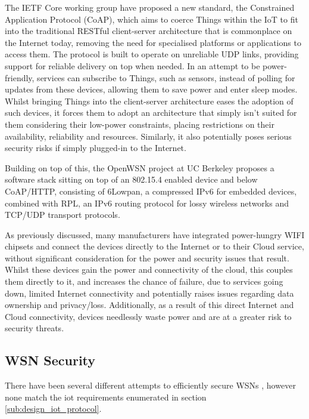 \documentclass{mpaper}
\begin{document}
The IETF Core working group have proposed a new standard, the Constrained Application Protocol (CoAP)\cite{IETF_COAP_HTTP}, which aims to coerce Things within the IoT to fit into the traditional RESTful client-server architecture that is commonplace on the Internet today, removing the need for specialised platforms or applications to access them. The protocol is built to operate on unreliable UDP links, providing support for reliable delivery on top when needed. In an attempt to be power-friendly, services can subscribe to Things, such as sensors, instead of polling for updates from these devices, allowing them to save power and enter sleep modes. Whilst bringing Things into the client-server architecture eases the adoption of such devices, it forces them to adopt an architecture that simply isn't suited for them considering their low-power constraints, placing restrictions on their availability, reliability and resources. Similarly, it also potentially poses serious security risks if simply plugged-in to the Internet\cite{BelkinWemo}.

Building on top of this, the OpenWSN project at UC Berkeley proposes a software stack sitting on top of an 802.15.4 enabled device and below CoAP/HTTP, consisting of 6Lowpan, a compressed IPv6 for embedded devices, combined with RPL, an IPv6 routing protocol for lossy wireless networks and TCP/UDP transport protocols.

As previously discussed, many manufacturers have integrated power-hungry WIFI chipsets and connect the devices directly to the Internet or to their Cloud service\cite{SmartThings,Belkin,Twine}, without significant consideration for the power and security issues that result. Whilst these devices gain the power and connectivity of the cloud, this couples them directly to it, and increases the chance of failure, due to services going down, limited Internet connectivity and potentially raises issues regarding data ownership and privacy/loss\cite{Playstation}. Additionally, as a result of this direct Internet and Cloud connectivity, devices needlessly waste power and are at a greater risk to security threats\cite{BelkinWemo,IoTWorm}. 
\subsection{WSN Security} %
\label{sub:wsn_security}
There have been several different attempts to efficiently secure WSNs \cite{TinySec,MiniSec,TinyECC,TinyPK,TinyPBC,Shi2013235,ContikiSec,MessageBottle,CertificatePairwise,MizanurRahman2010858}, however none match the iot requirements enumerated in section \ref{sub:design_iot_protocol}.
\end{document}
